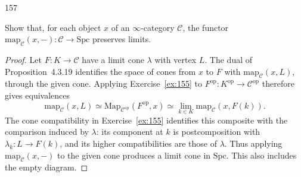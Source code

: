 \begin{exercise}{157}
\begingroup\raggedright%
Show that, for each object $x$ of an $\infty$-category $\mathcal{C}$, the functor \mbox{$\mathrm{map}_{\mathcal{C}}(x,-)\colon\mathcal{C}\to\mathrm{Spc}$} preserves limits.
\par\endgroup

\begin{proof}
Let $F\colon K\to\mathcal{C}$ have a limit cone $\lambda$ with vertex $L$.
The dual of Proposition~4.3.19 identifies the space of cones from $x$
to $F$ with $\mathrm{map}_{\mathcal{C}}(x,L)$, through the given cone.
Applying Exercise~\ref{ex:155} to
$F^{\mathrm{op}}\colon K^{\mathrm{op}}\to\mathcal{C}^{\mathrm{op}}$
therefore gives equivalences
\[
 \mathrm{map}_{\mathcal{C}}(x,L)
 \simeq\mathrm{Map}_{\mathcal{C}^{\mathrm{op}}}(F^{\mathrm{op}},x)
 \simeq\lim_{k\in K}\mathrm{map}_{\mathcal{C}}(x,F(k)).
\]
The cone compatibility in Exercise~\ref{ex:155} identifies this composite
with the comparison induced by $\lambda$: its component at $k$ is
postcomposition with $\lambda_k\colon L\to F(k)$, and its higher
compatibilities are those of $\lambda$.
Thus applying $\mathrm{map}_{\mathcal{C}}(x,-)$ to the given cone produces
a limit cone in $\mathrm{Spc}$. This also includes the empty diagram.
\end{proof}
\end{exercise}

